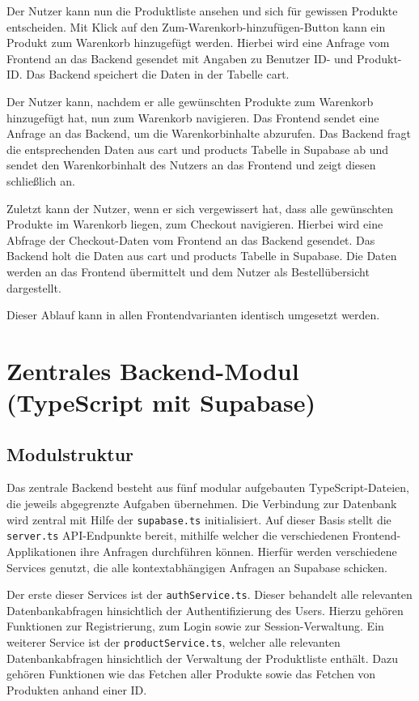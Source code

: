 \documentclass[oneside]{ausarbeitung}
\begin{document}
Der Nutzer kann nun die Produktliste ansehen und sich für gewissen Produkte entscheiden. Mit Klick auf den Zum-Warenkorb-hinzufügen-Button kann ein Produkt zum Warenkorb hinzugefügt werden. Hierbei wird eine Anfrage vom Frontend an das Backend gesendet mit Angaben zu Benutzer ID- und Produkt-ID. Das Backend speichert die Daten in der Tabelle cart. 

Der Nutzer kann, nachdem er alle gewünschten Produkte zum Warenkorb hinzugefügt hat, nun zum Warenkorb navigieren. Das Frontend sendet eine Anfrage an das Backend, um die Warenkorbinhalte abzurufen. Das Backend fragt die entsprechenden Daten aus cart und products Tabelle in Supabase ab und sendet den Warenkorbinhalt des Nutzers an das Frontend und zeigt diesen schließlich an. 

Zuletzt kann der Nutzer, wenn er sich vergewissert hat, dass alle gewünschten Produkte im Warenkorb liegen, zum Checkout navigieren. Hierbei wird eine Abfrage der Checkout-Daten vom Frontend an das Backend gesendet. Das Backend holt die Daten aus cart und products Tabelle in Supabase. Die Daten werden an das Frontend übermittelt und dem Nutzer als Bestellübersicht dargestellt.

Dieser Ablauf kann in allen Frontendvarianten identisch umgesetzt werden. 


\section{Zentrales Backend-Modul (TypeScript mit Supabase)}
\subsection{Modulstruktur}

Das zentrale Backend besteht aus fünf modular aufgebauten TypeScript-Dateien, die jeweils abgegrenzte Aufgaben übernehmen. Die Verbindung zur Datenbank wird zentral mit Hilfe der \texttt{supabase.ts} initialisiert. Auf dieser Basis stellt die \texttt{server.ts} API-Endpunkte bereit, mithilfe welcher die verschiedenen Frontend-Applikationen ihre Anfragen durchführen können. Hierfür werden verschiedene Services genutzt, die alle kontextabhängigen Anfragen an Supabase schicken.

Der erste dieser Services ist der \texttt{authService.ts}. Dieser behandelt alle relevanten Datenbankabfragen hinsichtlich der Authentifizierung des Users. Hierzu gehören Funktionen zur Registrierung, zum Login sowie zur Session-Verwaltung. Ein weiterer Service ist der \texttt{productService.ts}, welcher alle relevanten Datenbankabfragen hinsichtlich der Verwaltung der Produktliste enthält. Dazu gehören Funktionen wie das Fetchen aller Produkte sowie das Fetchen von Produkten anhand einer ID.
\end{document}

